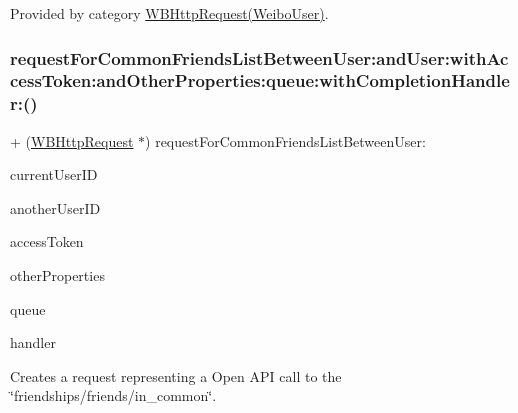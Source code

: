 Provided by category \mbox{\hyperlink{category_w_b_http_request_07_weibo_user_08_a0a601918d65f1776f99882facc1349e3}{W\+B\+Http\+Request(\+Weibo\+User)}}.

\mbox{\label{interface_w_b_http_request_a869234d6cc01353dcfc8f0f47ad06f5c}} 
\subsubsection{\texorpdfstring{request\+For\+Common\+Friends\+List\+Between\+User\+:and\+User\+:with\+Access\+Token\+:and\+Other\+Properties\+:queue\+:with\+Completion\+Handler\+:()}{requestForCommonFriendsListBetweenUser:andUser:withAccessToken:andOtherProperties:queue:withCompletionHandler:()}\hspace{0.1cm}{\footnotesize\ttfamily [1/3]}}
{\footnotesize\ttfamily + (\mbox{\hyperlink{interface_w_b_http_request}{W\+B\+Http\+Request}} $\ast$) request\+For\+Common\+Friends\+List\+Between\+User\+: \begin{DoxyParamCaption}\item[{(N\+S\+String $\ast$)}]{current\+User\+ID }\item[{andUser:(N\+S\+String $\ast$)}]{another\+User\+ID }\item[{withAccessToken:(N\+S\+String $\ast$)}]{access\+Token }\item[{andOtherProperties:(N\+S\+Dictionary $\ast$)}]{other\+Properties }\item[{queue:(N\+S\+Operation\+Queue $\ast$)}]{queue }\item[{withCompletionHandler:(W\+B\+Request\+Handler)}]{handler }\end{DoxyParamCaption}}

Creates a request representing a Open A\+PI call to the \char`\"{}friendships/friends/in\+\_\+common\char`\"{}.

